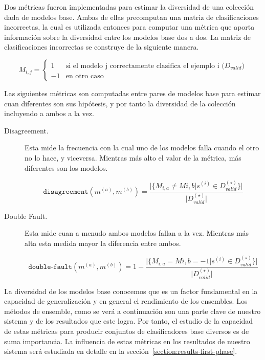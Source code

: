 Dos métricas fueron implementadas para estimar la diversidad de una colección dada de modelos base.
Ambas de ellas precomputan una matriz de clasificaciones incorrectas, la cual es utilizada entonces para computar una métrica que aporta información sobre la diversidad entre los modelos base dos a dos.
La matriz de clasificaciones incorrectas se construye de la siguiente manera.

\begin{equation}
    M_{i,j} =
    \begin{cases}
        1 & \text{si el modelo j correctamente clasifica el ejemplo i ($D_{valid}$)} \\
        -1 & \text{en otro caso}
    \end{cases}
\end{equation}

Las siguientes métricas son computadas entre pares de modelos base para estimar cuan diferentes son sus hipótesis, y por tanto la diversidad de la colección incluyendo a ambos a la vez.

\begin{description}

    \item[Disagreement.]
    Esta mide la frecuencia con la cual uno de los modelos falla cuando el otro no lo hace, y viceversa.
    Mientras más alto el valor de la métrica, más diferentes son los modelos.

    \begin{equation}
        \texttt{disagreement}(m^{(a)}, m^{(b)}) = \frac{\vert\{M_{i,a} \neq M{i,b} \vert s^{(i)} \in D^{(\star)}_{valid}\}\vert}{\vert D^{(\star)}_{valid} \vert}
    \end{equation}

    \item[Double Fault.]
    Esta mide cuan a menudo ambos modelos fallan a la vez.
    Mientras más alta esta medida mayor la diferencia entre ambos.

    \begin{equation}
        \texttt{double-fault}(m^{(a)}, m^{(b)}) = 1 - \frac{\vert\{M_{i,a} = M{i,b} = -1 \vert s^{(i)} \in D^{(\star)}_{valid}\}\vert}{\vert D^{(\star)}_{valid} \vert}
    \end{equation}
    
\end{description}

La diversidad de los modelos base conocemos que es un factor fundamental en la capacidad de generalización y en general el rendimiento de los ensembles.
Los métodos de ensemble, como se verá a continuación son una parte clave de nuestro sistema y de los resultados que este logra.
Por tanto, el estudio de la capacidad de estas métricas para producir conjuntos de clasificadores base diversos es de suma importancia.
La influencia de estas métricas en los resultados de nuestro sistema será estudiada en detalle en la sección~\ref{section:results-first-phase}.

